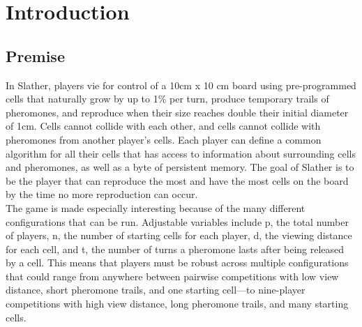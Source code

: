 \section{Introduction}
\subsection{Premise}
In Slather, players vie for control of a 10cm x 10 cm board using pre-programmed cells that naturally grow by up to 1\% per turn, produce temporary trails of pheromones, and reproduce when their size reaches double their initial diameter of 1cm. Cells cannot collide with each other, and cells cannot collide with pheromones from another player’s cells. Each player can define a common algorithm for all their cells that has access to information about surrounding cells and pheromones, as well as a byte of persistent memory. The goal of Slather is to be the player that can reproduce the most and have the most cells on the board by the time no more reproduction can occur.\\


The game is made especially interesting because of the many different configurations that can be run. Adjustable variables include p, the total number of players, n, the number of starting cells for each player, d, the viewing distance for each cell, and t, the number of turns a pheromone lasts after being released by a cell. This means that players must be robust across multiple configurations that could range from anywhere between pairwise competitions with low view distance, short pheromone trails, and one starting cell—to nine-player competitions with high view distance, long pheromone trails, and many starting cells.

